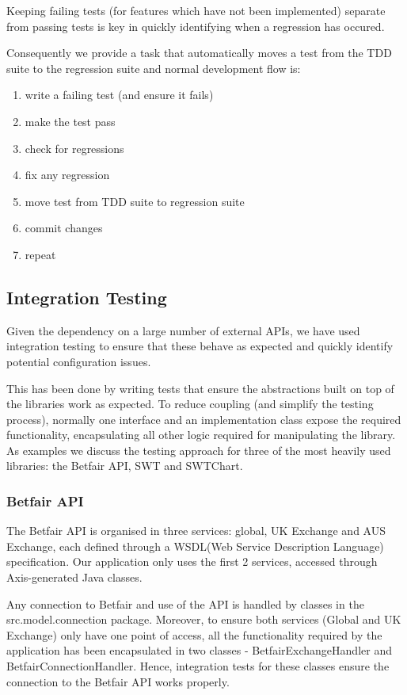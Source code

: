 \documentclass[10pt]{article}
\begin{document}
Keeping failing tests (for features which have not been implemented) separate from passing tests is key in quickly identifying when a regression has occured.

Consequently we provide a task that automatically moves a test from the TDD suite to the regression suite and normal development flow is: 
\begin{enumerate}
\item write a failing test (and ensure it fails)
\item make the test pass
\item check for regressions
\item fix any regression
\item move test from TDD suite to regression suite
\item commit changes
\item repeat
\end{enumerate}

\subsection{Integration Testing}

Given the dependency on a large number of external APIs, we have used integration testing to ensure that these behave as expected and quickly identify potential configuration issues. 

This has been done by writing tests that ensure the abstractions built on top of the libraries work as expected. To reduce coupling (and simplify the testing process), normally one interface and an implementation class expose the required functionality, encapsulating all other logic required for manipulating the library. As examples we discuss the testing approach for three of the most heavily used libraries: the Betfair API, SWT and SWTChart.

\subsubsection{Betfair API}

The Betfair API is organised in three services: global, UK Exchange and AUS Exchange, each defined through a WSDL(Web Service Description Language) specification. Our application only uses the first 2 services, accessed through Axis-generated Java classes.

Any connection to Betfair and use of the API is handled by classes in the src.model.connection package. Moreover, to ensure both services (Global and UK Exchange) only have one point of access, all the functionality required by the application has been encapsulated in two classes - BetfairExchangeHandler and BetfairConnectionHandler. Hence, integration tests for these classes ensure the connection to the Betfair API works properly.
\end{document}
